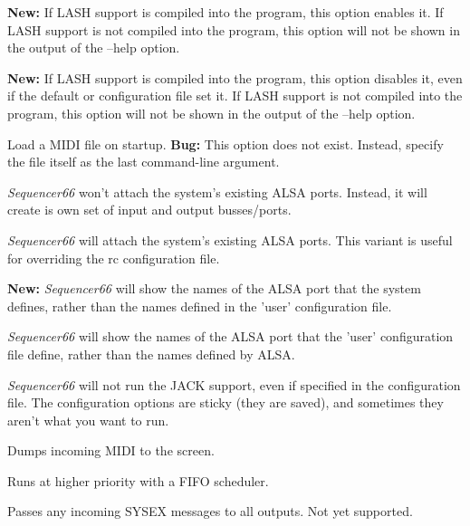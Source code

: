       \textbf{New:}
      If LASH support is compiled into the program, this option
      enables it.
      If LASH support is not compiled into the program, this option will not
      be shown in the output of the --help option.

      \textbf{New:}
      If LASH support is compiled into the program, this option
      disables it, even if the default or configuration file set it.
      If LASH support is not compiled into the program, this option will not
      be shown in the output of the --help option.

      Load a MIDI file on startup.
      \textbf{Bug:}
      This option does not exist.
      Instead, specify the file itself as the last command-line argument.

      \textsl{Sequencer66} won't attach the system's existing ALSA ports.
      Instead, it will create is own set of input and output busses/ports.

      \textsl{Sequencer66} will attach the system's existing ALSA ports.
      This variant is useful for overriding the rc configuration file.

      \textbf{New:}
      \textsl{Sequencer66} will show the names of the ALSA port that the system
      defines, rather than the names defined in the 'user' configuration file.

      \textsl{Sequencer66} will show the names of the ALSA port that the 'user'
      configuration file define, rather than the names defined by ALSA.

      \textsl{Sequencer66} will not run the JACK support, even if specified
      in the configuration file.  The configuration options are sticky (they
      are saved), and sometimes they aren't what you want to run.

      Dumps incoming MIDI to the screen.

      Runs at higher priority with a FIFO scheduler.

      Passes any incoming SYSEX messages to all outputs.
		Not yet supported.


